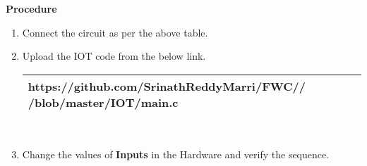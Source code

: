 \documentclass[journal,12pt,twocolumn]{IEEEtran}
\begin{document}
\textbf{Procedure}
\begin{enumerate}[label={\arabic*}.]
	\item Connect the circuit as per the above table.
	\item Upload the IOT code from  the below link.\\

\begin{tabularx}{0.45\textwidth}{
		| >{\centering\arraybackslash}X|}
	\hline
	https://github.com/SrinathReddyMarri/FWC//
	/blob/master/IOT/main.c\\
	\hline

\end{tabularx}\\
	\item Change the values of \textbf{Inputs} in the Hardware and verify the sequence.
\end{enumerate}
\end{document}
